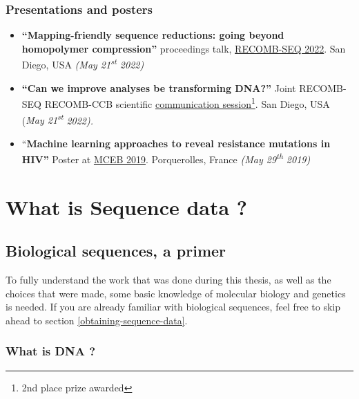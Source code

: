 \documentclass[
  11pt,
  twoside,
  BCOR=10mm,
  listof=totoc]{scrbook}
\begin{document}
\hypertarget{presentations-and-posters}{%
\subsection*{Presentations and posters}\label{presentations-and-posters}}

\begin{itemize}
\item
  \textbf{``Mapping-friendly sequence reductions: going beyond homopolymer compression''} proceedings talk, \href{https://recomb2022.net/recomb-seq/}{RECOMB-SEQ 2022}. San Diego, USA \emph{(May 21\textsuperscript{st} 2022)}
\item
  \textbf{``Can we improve analyses be transforming DNA?''} Joint RECOMB-SEQ RECOMB-CCB scientific \href{https://recomb2022.net/recomb-ccb-seq-scientific-communication/}{communication session}\footnote{2nd place prize awarded}. San Diego, USA (\emph{May 21\textsuperscript{st}} \emph{2022).}
\item
  ``\textbf{Machine learning approaches to reveal resistance mutations in HIV''} Poster at \href{https://www.lirmm.fr/mceb2019/}{MCEB 2019}. Porquerolles, France \emph{(May 29\textsuperscript{th} 2019)}
\end{itemize}

\hypertarget{what-is-sequence-data}{%
\chapter{What is Sequence data ?}\label{what-is-sequence-data}}

\hypertarget{biological-sequences-a-primer}{%
\section{Biological sequences, a primer}\label{biological-sequences-a-primer}}

To fully understand the work that was done during this thesis, as well as the choices that were made, some basic knowledge of molecular biology and genetics is needed. If you are already familiar with biological sequences, feel free to skip ahead to section \ref{obtaining-sequence-data}.

\hypertarget{what-is-dna}{%
\subsection{What is DNA ?}\label{what-is-dna}}
\end{document}

